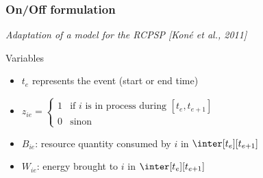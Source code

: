   \begin{frame}
    \frametitle{On/Off formulation}
    {\small \it Adaptation of a model for the RCPSP {\color{gray!50!black!50} \it [Koné et al., 2011]}}
    \vfill
    \pause
    \begin{block}{Variables}
      \begin{itemize}
      \item  $t_e$ represents the event (start or end time)
        \pause
        \vspace{0.3cm}
      \item $z_{ie}=\left\{
          \begin{array}{ll}
            1 & \text{if $i$ is in process during $[t_{e},t_{e+1}]$}\\
            0 & \text{sinon}
          \end{array}
        \right.
        $
        \pause
        \vspace{0.3cm}
      \item $B_{ie}$: resource quantity consumed by $i$ in $\inter[t_e][t_{e+1}]$
        \vspace{0.3cm}
      \item $W_{ie}$: energy brought to $i$ in $\inter[t_e][t_{e+1}]$   
      \end{itemize}
    \end{block}
  \end{frame}







